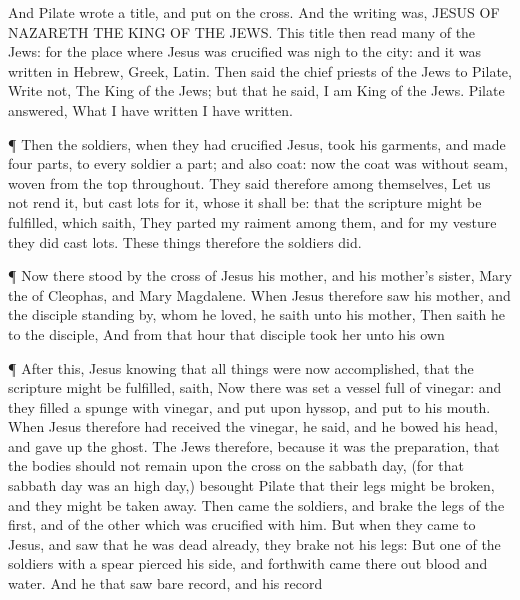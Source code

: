 {And
Pilate
wrote a
title,
and
put
{}
on the
cross.
And the
writing
was,
JESUS OF
NAZARETH THE
KING OF THE
JEWS.
This
title
then
read
many of the
Jews:
for the
place
where
Jesus
was crucified
was
nigh to the
city:
and it
was
written in
Hebrew,
{}
Greek,
{}
Latin.
Then
said the chief
priests of the
Jews to
Pilate,
Write
not, The
King of the
Jews;
but
that
he
said, I
am
King of the
Jews.
Pilate
answered,
What I have
written I have
written.
\par }{\PP {}¶
Then the
soldiers,
when they had
crucified
Jesus,
took
his
garments,
and
made
four
parts, to
every
soldier a
part; and
also
{}
coat:
now the
coat
was without
seam,
woven
from the
top
throughout.
They
said
therefore
among
themselves, Let
us
not
rend
it,
but cast
lots
for
it,
whose it shall
be:
that the
scripture might be
fulfilled, which
saith, They
parted
my
raiment among
them,
and
for
my
vesture they did
cast
lots. These
things
therefore the
soldiers
did.
\par }{\PP {}¶
Now there
stood
by the
cross of
Jesus
his
mother,
and
his
mother’s
sister,
Mary the
{} of
Cleophas,
and
Mary
Magdalene.
When
Jesus
therefore
saw his
mother,
and the
disciple standing
by,
whom he
loved, he
saith unto
his
mother,
{}
Then saith
he to the
disciple,
{}
And
from
that
hour that
disciple
took
her
unto his
own
{}
\par }{\PP {}¶
After
this,
Jesus
knowing
that all
things were
now
accomplished,
that the
scripture might be
fulfilled,
saith,
{}
Now there was
set a
vessel
full of
vinegar:
and they
filled a
spunge with
vinegar,
and
put
{} upon
hyssop, and
put
{} to
his
mouth.
When
Jesus
therefore had
received the
vinegar, he
said,
{}
and he
bowed his
head, and gave
up the
ghost.
The
Jews
therefore,
because it
was the
preparation,
that the
bodies
should
not
remain
upon the
cross
on the sabbath
day, (for
that sabbath
day
was an
high
day,)
besought
Pilate
that
their
legs might be
broken,
and
{} they might be taken
away.
Then
came the
soldiers,
and
brake the
legs of the
first,
and of the
other
which was
crucified with
him.
But
when they
came
to
Jesus, and saw
that
he was
dead
already, they
brake
not
his
legs:
But
one of the
soldiers with a
spear
pierced
his
side,
and
forthwith came there
out
blood
and
water.
And
he that
saw
{} bare
record,
and
his
record
}

